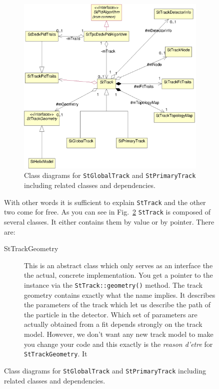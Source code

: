 \documentclass[twoside]{article}
\begin{document}
\begin{figure}[htb]
\begin{center}
\begin{figure}[p]
    \begin{center}
        \includegraphics{tracks.eps}
        \caption{Class diagrams for \texttt{StGlobalTrack} and
            \texttt{StPrimaryTrack} including related classes
            and dependencies.}
        \label{fig:umlTracks}
    \end{center}
\end{figure}
With other words it is sufficient to explain \texttt{StTrack} and the
other two come for free. As you can see in Fig.~\ref{fig:umlTracks}
\texttt{StTrack} is composed of several classes. It either contains
them by value or by pointer. There are:
\begin{description}
\item[StTrackGeometry]  This is an abstract
    class which only serves as an interface the the actual, concrete
    implementation. You get a pointer to the instance via the
    \texttt{StTrack::geometry()} method. The track geometry contains
    exactly what the name implies.  It describes the parameters of the
    track which let us describe the path of the particle in the
    detector. Which set of parameters are actually obtained from a fit
    depends strongly on the track model.  However, we don't want any
    new track model to make you change your code and this exactly is
    the \textit{reason d'etre} for \texttt{StTrackGeometry}. It

\end{description}
\end{center}
\end{figure}
\end{document}
